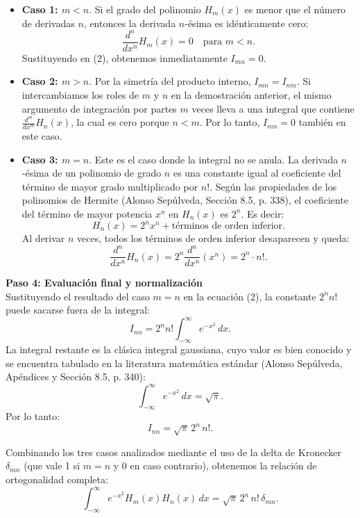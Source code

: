 \documentclass[a4paper]{article}
\begin{document}
\begin{itemize}
    \item \textbf{Caso 1: $m < n$}. Si el grado del polinomio $H_m(x)$ es menor que el número de derivadas $n$, entonces la derivada $n$-ésima es idénticamente cero:
    $$
    \frac{d^n}{dx^n} H_m(x) = 0 \quad \text{para } m < n.
    $$
    Sustituyendo en (2), obtenemos inmediatamente $I_{mn} = 0$.

    \item \textbf{Caso 2: $m > n$}. Por la simetría del producto interno, $I_{mn} = I_{nm}$. Si intercambiamos los roles de $m$ y $n$ en la demostración anterior, el mismo argumento de integración por partes $m$ veces lleva a una integral que contiene $\frac{d^m}{dx^m} H_n(x)$, la cual es cero porque $n < m$. Por lo tanto, $I_{mn} = 0$ también en este caso.

    \item \textbf{Caso 3: $m = n$}. Este es el caso donde la integral no se anula. La derivada $n$-ésima de un polinomio de grado $n$ es una constante igual al coeficiente del término de mayor grado multiplicado por $n!$. Según las propiedades de los polinomios de Hermite (Alonso Sepúlveda, Sección 8.5, p. 338), el coeficiente del término de mayor potencia $x^n$ en $H_n(x)$ es $2^n$. Es decir:
    $$
    H_n(x) = 2^n x^n + \text{términos de orden inferior}.
    $$
    Al derivar $n$ veces, todos los términos de orden inferior desaparecen y queda:
    $$
    \frac{d^n}{dx^n} H_n(x) = 2^n \frac{d^n}{dx^n} (x^n) = 2^n \cdot n!.
    $$
\end{itemize}

\vspace{0.3cm}
\noindent\textbf{Paso 4: Evaluación final y normalización} \\
Sustituyendo el resultado del caso $m=n$ en la ecuación (2), la constante $2^n n!$ puede sacarse fuera de la integral:
$$
I_{nn} = 2^n n! \int_{-\infty}^{\infty} e^{-x^2} \, dx.
$$
La integral restante es la clásica integral gaussiana, cuyo valor es bien conocido y se encuentra tabulado en la literatura matemática estándar (Alonso Sepúlveda, Apéndices y Sección 8.5, p. 340):
$$
\int_{-\infty}^{\infty} e^{-x^2} \, dx = \sqrt{\pi}.
$$
Por lo tanto:
$$
I_{nn} = \sqrt{\pi} \, 2^n \, n!.
$$

Combinando los tres casos analizados mediante el uso de la delta de Kronecker $\delta_{mn}$ (que vale 1 si $m=n$ y 0 en caso contrario), obtenemos la relación de ortogonalidad completa:
$$
\int_{-\infty}^{\infty} e^{-x^2} H_m(x) H_n(x) \, dx = \sqrt{\pi} \, 2^n \, n! \, \delta_{mn}.
$$
\end{document}
